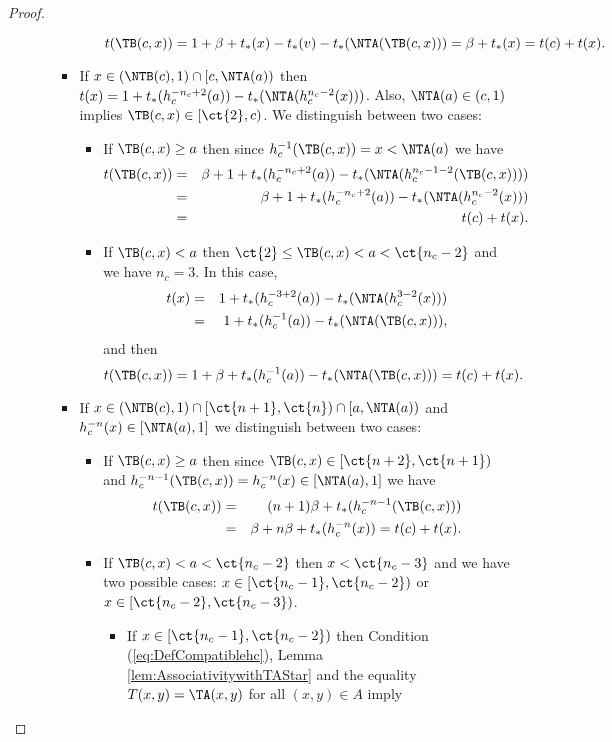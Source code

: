 \begin{proof}
\begin{enumerate}[label=(\roman*)]
\begin{itemize}
\begin{itemize}
\begin{itemize}
$$					t(\TB(c,x))= 1 + \beta +  t_*(x) - t_*(v) - t_*(\NTA(\TB(c,x))) = \beta +  t_*(x)  = t(c)+t(x).
					$$
				\end{itemize}
				\item If $x \in (\NTB(c),1) \cap  [c,\NTA(a))$ then $t(x)= 1 + t_*(h_c^{-n_c+2}(a)) - t_*(\NTA(h_c^{n_c-2}(x)))$. Also, $\NTA(a) \in (c,1)$ implies $\TB(c,x) \in [\ct{2},c)$. We distinguish between two cases:
				\begin{itemize}
					\item If $\TB(c,x)\geq a$ then since $h_c^{-1}(\TB(c,x))=x < \NTA(a)$ we have
					\begin{eqnarray*}
						t(\TB(c,x)) &=& \beta + 1 + t_*(h_c^{-n_c+2}(a)) - t_*(\NTA(h_c^{n_c-1-2}(\TB(c,x)))) \\
						&=& \beta + 1 + t_*(h_c^{-n_c+2}(a)) - t_*(\NTA(h_c^{n_c-2}(x))) \\
						&=& t(c) + t(x).
					\end{eqnarray*}
					\item If $\TB(c,x)< a$ then $\ct{2} \leq \TB(c,x)< a < \ct{n_c-2}$ and we have $n_c=3$. In this case,
					\begin{eqnarray*}
					t(x) & = & 1 + t_*(h_c^{-3+2}(a)) - t_*(\NTA(h_c^{3-2}(x)))\\
					& = & 1 + t_*(h_c^{-1}(a)) - t_*(\NTA(\TB(c,x))),
					\end{eqnarray*}
					and then
					$$t(\TB(c,x)) = 1 + \beta + t_*(h_c^{-1}(a)) - t_*(\NTA(\TB(c,x))) = t(c)+t(x).$$
				\end{itemize}
				\item If $x \in (\NTB(c),1) \cap  [\ct{n+1},\ct{n}) \cap [a,\NTA(a))$ and $h_c^{-n}(x) \in [\NTA(a),1]$ we distinguish between two cases:
				\begin{itemize}
					\item If $\TB(c,x) \geq a$ then since $\TB(c,x) \in [\ct{n+2},\ct{n+1})$ and $h_c^{-n-1}(\TB(c,x))=h_c^{-n}(x) \in [\NTA(a),1]$ we have
					\begin{eqnarray*}
					t(\TB(c,x)) & = & (n+1)\beta + t_*(h_c^{-n-1}(\TB(c,x))) \\
					& = & \beta + n\beta + t_*(h_c^{-n}(x))=t(c)+t(x).
					\end{eqnarray*}
					\item If $\TB(c,x) < a<\ct{n_c-2}$ then $x < \ct{n_c-3}$ and we have two possible cases: $x \in [\ct{n_c-1},\ct{n_c-2})$ or $x \in [\ct{n_c-2},\ct{n_c-3})$.
					\begin{itemize}
						\item If $ x \in [\ct{n_c-1},\ct{n_c-2})$ then Condition (\ref{eq:DefCompatiblehc}), Lemma \ref{lem:AssociativitywithTAStar} and the equality $T(x,y)=\TA(x,y)$ for all $(x,y) \in A$ imply

\end{itemize}
\end{itemize}
\end{itemize}
\end{itemize}
\end{enumerate}
\end{proof}
